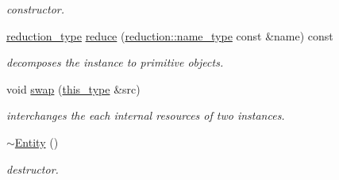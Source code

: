 \begin{DoxyCompactItemize}
\begin{DoxyCompactList}\small\item\em constructor. \end{DoxyCompactList}\item 
\hypertarget{classhryky_1_1http_1_1header_1_1cache_1_1control_1_1_entity_a9fe4a0827796b44b915d95d3e722a429}{\hyperlink{namespacehryky_a343a9a4c36a586be5c2693156200eadc}{reduction\-\_\-type} \hyperlink{classhryky_1_1http_1_1header_1_1cache_1_1control_1_1_entity_a9fe4a0827796b44b915d95d3e722a429}{reduce} (\hyperlink{namespacehryky_1_1reduction_ac686c30a4c8d196bbd0f05629a6b921f}{reduction\-::name\-\_\-type} const \&name) const }\label{classhryky_1_1http_1_1header_1_1cache_1_1control_1_1_entity_a9fe4a0827796b44b915d95d3e722a429}

\begin{DoxyCompactList}\small\item\em decomposes the instance to primitive objects. \end{DoxyCompactList}\item 
\hypertarget{classhryky_1_1http_1_1header_1_1cache_1_1control_1_1_entity_afa2f3b06ff23758c01896c4bdfa81942}{void \hyperlink{classhryky_1_1http_1_1header_1_1cache_1_1control_1_1_entity_afa2f3b06ff23758c01896c4bdfa81942}{swap} (\hyperlink{classhryky_1_1http_1_1header_1_1cache_1_1control_1_1_entity_aa2d258ee93a9cca251a8cfe0b9ed3f4d}{this\-\_\-type} \&src)}\label{classhryky_1_1http_1_1header_1_1cache_1_1control_1_1_entity_afa2f3b06ff23758c01896c4bdfa81942}

\begin{DoxyCompactList}\small\item\em interchanges the each internal resources of two instances. \end{DoxyCompactList}\item 
\hypertarget{classhryky_1_1http_1_1header_1_1cache_1_1control_1_1_entity_add0c24731b183e816384f1a2ff239551}{\hyperlink{classhryky_1_1http_1_1header_1_1cache_1_1control_1_1_entity_add0c24731b183e816384f1a2ff239551}{$\sim$\-Entity} ()}\label{classhryky_1_1http_1_1header_1_1cache_1_1control_1_1_entity_add0c24731b183e816384f1a2ff239551}

\begin{DoxyCompactList}\small\item\em destructor. \end{DoxyCompactList}\end{DoxyCompactItemize}

